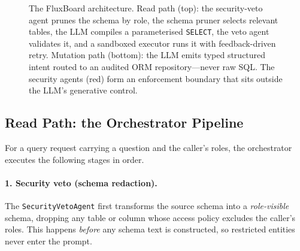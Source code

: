 \documentclass[runningheads]{llncs}
\begin{document}
\begin{figure}[htbp]
{%
}
\caption{The FluxBoard architecture. Read path (top): the security-veto agent prunes the schema by role, the schema pruner selects relevant tables, the LLM compiles a parameterised \texttt{SELECT}, the veto agent validates it, and a sandboxed executor runs it with feedback-driven retry. Mutation path (bottom): the LLM emits typed structured intent routed to an audited ORM repository---never raw SQL. The security agents (red) form an enforcement boundary that sits outside the LLM's generative control.}
\label{fig:arch}
\end{figure}

\subsection{Read Path: the Orchestrator Pipeline}
For a query request carrying a question and the caller's roles, the orchestrator executes the following stages in order.

\paragraph{1. Security veto (schema redaction).} The \texttt{SecurityVetoAgent} first transforms the source schema into a \emph{role-visible} schema, dropping any table or column whose access policy excludes the caller's roles. This happens \emph{before} any schema text is constructed, so restricted entities never enter the prompt.
\end{document}
